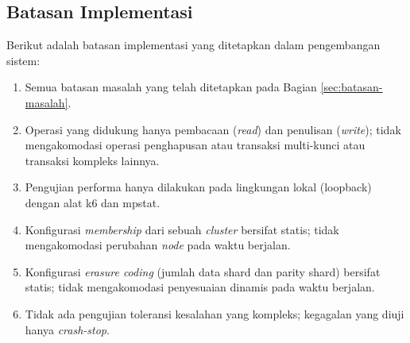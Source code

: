 \subsection{Batasan Implementasi}
\label{subsection:batasan-implementasi}

Berikut adalah batasan implementasi yang ditetapkan dalam pengembangan sistem:
\begin{enumerate}
	\item Semua batasan masalah yang telah ditetapkan pada Bagian \ref{sec:batasan-masalah}.
	\item Operasi yang didukung hanya pembacaan (\textit{read}) dan penulisan (\textit{write}); tidak mengakomodasi operasi penghapusan atau transaksi multi-kunci atau transaksi kompleks lainnya.
	\item Pengujian performa hanya dilakukan pada lingkungan lokal (loopback) dengan alat k6 dan mpstat.
	\item Konfigurasi \textit{membership} dari sebuah \textit{cluster} bersifat statis; tidak mengakomodasi perubahan \textit{node} pada waktu berjalan.
	\item Konfigurasi \textit{erasure coding} (jumlah data shard dan parity shard) bersifat statis; tidak mengakomodasi penyesuaian dinamis pada waktu berjalan.
	\item Tidak ada pengujian toleransi kesalahan yang kompleks; kegagalan yang diuji hanya \textit{crash-stop}.
\end{enumerate}

